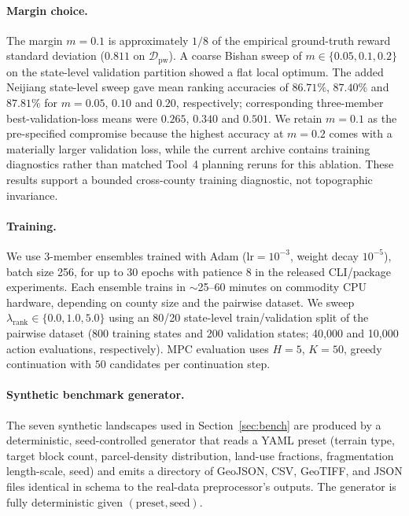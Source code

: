\documentclass[11pt]{article}
\begin{document}
\paragraph{Margin choice.} The margin $m = 0.1$ is approximately $1/8$ of the empirical ground-truth reward standard deviation ($0.811$ on $\mathcal{D}_{\text{pw}}$). A coarse Bishan sweep of $m \in \{0.05, 0.1, 0.2\}$ on the state-level validation partition showed a flat local optimum. The added Neijiang state-level sweep gave mean ranking accuracies of $86.71\%$, $87.40\%$ and $87.81\%$ for $m=0.05$, $0.10$ and $0.20$, respectively; corresponding three-member best-validation-loss means were $0.265$, $0.340$ and $0.501$. We retain $m=0.1$ as the pre-specified compromise because the highest accuracy at $m=0.2$ comes with a materially larger validation loss, while the current archive contains training diagnostics rather than matched Tool~4 planning reruns for this ablation. These results support a bounded cross-county training diagnostic, not topographic invariance.

\paragraph{Training.} We use 3-member ensembles trained with Adam ($\text{lr}=10^{-3}$, weight decay $10^{-5}$), batch size 256, for up to 30 epochs with patience 8 in the released CLI/package experiments. Each ensemble trains in $\sim$25--60 minutes on commodity CPU hardware, depending on county size and the pairwise dataset. We sweep $\lambda_{\text{rank}} \in \{0.0, 1.0, 5.0\}$ using an 80/20 state-level train/validation split of the pairwise dataset (800 training states and 200 validation states; 40,000 and 10,000 action evaluations, respectively). MPC evaluation uses $H{=}5$, $K{=}50$, greedy continuation with $50$ candidates per continuation step.

\paragraph{Synthetic benchmark generator.}\label{sec:methods-synth}

The seven synthetic landscapes used in Section~\ref{sec:bench} are produced by a deterministic, seed-controlled generator that reads a YAML preset (terrain type, target block count, parcel-density distribution, land-use fractions, fragmentation length-scale, seed) and emits a directory of GeoJSON, CSV, GeoTIFF, and JSON files identical in schema to the real-data preprocessor's outputs. The generator is fully deterministic given $(\text{preset}, \text{seed})$.
\end{document}
